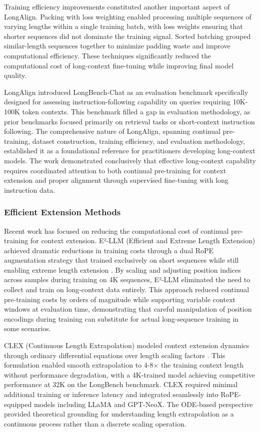 \documentclass[11pt,letterpaper]{article}
\begin{document}
Training efficiency improvements constituted another important aspect of LongAlign. Packing with loss weighting enabled processing multiple sequences of varying lengths within a single training batch, with loss weights ensuring that shorter sequences did not dominate the training signal. Sorted batching grouped similar-length sequences together to minimize padding waste and improve computational efficiency. These techniques significantly reduced the computational cost of long-context fine-tuning while improving final model quality.

LongAlign introduced LongBench-Chat as an evaluation benchmark specifically designed for assessing instruction-following capability on queries requiring 10K-100K token contexts. This benchmark filled a gap in evaluation methodology, as prior benchmarks focused primarily on retrieval tasks or short-context instruction following. The comprehensive nature of LongAlign, spanning continual pre-training, dataset construction, training efficiency, and evaluation methodology, established it as a foundational reference for practitioners developing long-context models. The work demonstrated conclusively that effective long-context capability requires coordinated attention to both continual pre-training for context extension and proper alignment through supervised fine-tuning with long instruction data.

\subsubsection{Efficient Extension Methods}

Recent work has focused on reducing the computational cost of continual pre-training for context extension. E²-LLM (Efficient and Extreme Length Extension) achieved dramatic reductions in training costs through a dual RoPE augmentation strategy that trained exclusively on short sequences while still enabling extreme length extension \cite{xnhyacinth2024e2llm}. By scaling and adjusting position indices across samples during training on 4K sequences, E²-LLM eliminated the need to collect and train on long-context data entirely. This approach reduced continual pre-training costs by orders of magnitude while supporting variable context windows at evaluation time, demonstrating that careful manipulation of position encodings during training can substitute for actual long-sequence training in some scenarios.

CLEX (Continuous Length Extrapolation) modeled context extension dynamics through ordinary differential equations over length scaling factors \cite{chen2024clex}. This formulation enabled smooth extrapolation to 4-8$\times$ the training context length without performance degradation, with a 4K-trained model achieving competitive performance at 32K on the LongBench benchmark. CLEX required minimal additional training or inference latency and integrated seamlessly into RoPE-equipped models including LLaMA and GPT-NeoX. The ODE-based perspective provided theoretical grounding for understanding length extrapolation as a continuous process rather than a discrete scaling operation.
\end{document}
